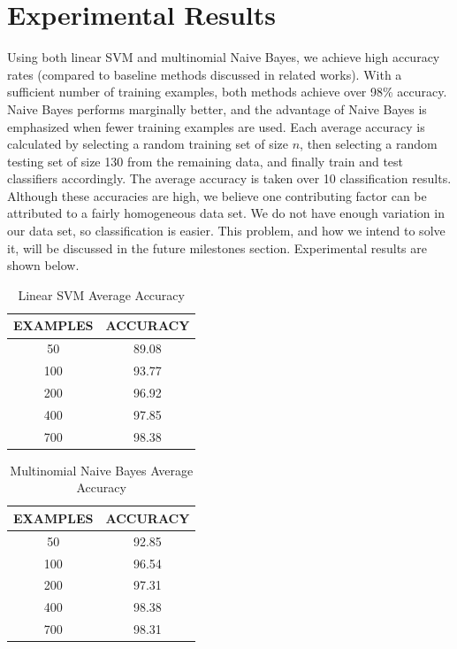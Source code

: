 \documentclass{article} %
\begin{document}
\section{Experimental Results}
Using both linear SVM and multinomial Naive Bayes, we achieve high accuracy rates (compared to baseline methods discussed in related works). With a sufficient number of training examples, both methods achieve over 98\% accuracy. Naive Bayes performs marginally better, and the advantage of Naive Bayes is emphasized when fewer training examples are used. Each average accuracy is calculated by selecting a random training set of size $n$, then selecting a random testing set of size 130 from the remaining data, and finally train and test classifiers accordingly. The average accuracy is taken over 10 classification results. Although these accuracies are high, we believe one contributing factor can be attributed to a fairly homogeneous data set. We do not have enough variation in our data set, so classification is easier. This problem, and how we intend to solve it, will be discussed in the future milestones section. Experimental results are shown below.

\begin{table}[hp]
\caption{Linear SVM Average Accuracy}
\begin{center}
\begin{tabular}{c|c}
{\bf EXAMPLES}  &{\bf ACCURACY}
\\ \hline
50              &89.08 \\
100             &93.77 \\
200             &96.92 \\
400             &97.85 \\
700             &98.38 \\
\end{tabular}
\end{center}
\end{table}

\begin{table}[hp]
\caption{Multinomial Naive Bayes Average Accuracy}
\begin{center}
\begin{tabular}{c|c}
{\bf EXAMPLES}  &{\bf ACCURACY}
\\ \hline 
50              &92.85 \\
100             &96.54 \\
200             &97.31 \\
400             &98.38 \\
700             &98.31 \\
\end{tabular}
\end{center}
\end{table}
\end{document}
